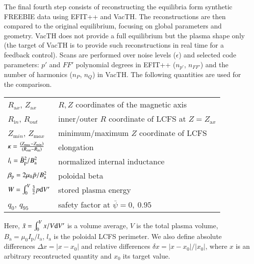The final fourth step consists of reconstructing the equilibria form synthetic FREEBIE data using EFIT++ and VacTH. The reconstructions are then compared to the original equilibrium, focusing on global parameters and geometry. VacTH does not provide a full equilibrium but the plasma shape only (the target of VacTH is to provide such reconstructions in real time for a feedback control). Scans are performed over noise levels ($\epsilon$) and selected code parameters: $p'$ and $FF'$ polynomial degrees in EFIT++ ($n_{p'}$, $n_{FF'}$) and the number of harmonics ($n_P$, $n_Q$) in VacTH. The following quantities are used for the comparison.
\begin{table}[!h]
    \begin{tabular}{ll}
    $R_{\mathrm ax}$, $Z_{\mathrm ax}$ & $R,Z$ coordinates of the magnetic axis \\
    $R_{\mathrm in}$, $R_{\mathrm out}$ & inner/outer $R$ coordinate of LCFS at $Z=Z_{\mathrm ax}$ \\
    $Z_{\mathrm min}$, $Z_{\mathrm max}$ & minimum/maximum $Z$ coordinate of LCFS \\
    $\kappa  = \frac{\left( {{Z_{{\rm{max}}}} - {Z_{{\rm{min}}}}} \right) } { \left( {{R_{{\rm{out}}}} - {R_{{\rm{in}}}}} \right) }$          & elongation   \\
    ${l_{\rm{i}}} = {{\bar B_{\rm{p}}^2}} / {{B_{\rm{a}}^2}}$          & normalized internal inductance   \\
    ${\beta _{\rm{p}}} = {{2{\mu _0}\bar p}} / {{B_{\rm{a}}^2}}$          & poloidal beta   \\
    $ W = \int_0^V {\frac{3}{2}p{\rm{d}}V'}$ & stored plasma energy \\
    $ q_0$, $q_{95}$ & safety factor at $\bar \psi = 0,\ 0.95$ \\
    \end{tabular}
\end{table}

Here, $\bar x = \int_0^V {x/V{\rm{d}}V'} $ is a volume average, $V$ is the total plasma volume, $B_{\mathrm a} = \mu _0 I_\mathrm{p} / l_{\mathrm a}$, $l_{\mathrm a}$ is the poloidal LCFS perimeter.
We also define absolute differences $\Delta x = \left| {x - {x_0}} \right|$ and relative differences $\delta x = \left| {x - {x_0}} \right|/\left| {{x_0}} \right|$, where $x$ is an arbitrary recontructed quantity and $x_0$ its target value.

